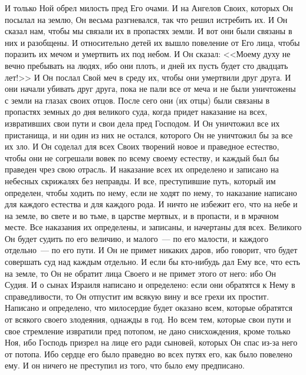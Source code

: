И только Ной обрел милость пред Его очами. И на Ангелов Своих, которых Он
посылал на землю, Он весьма разгневался, так что решил истребить их. И Он
сказал нам, чтобы мы связали их в пропастях земли. И вот они были связаны в них
и разобщены. И относительно детей их вышло повеление от Его лица, чтобы
поразить их мечом и умертвить их под небом. И Он сказал: <<Моему духу не
вечно пребывать на людях, ибо они плоть, и дней их пусть будет сто двадцать
лет!>> И Он послал Свой меч в среду их, чтобы они умертвили друг друга. И
они начали убивать друг друга, пока не пали все от меча и не были уничтожены с
земли на глазах своих отцов. После сего они (их отцы) были связаны в пропастях
земных до дня великого суда, когда придет наказание на всех, извративших свои
пути и свои дела пред Господом. И Он уничтожил все их пристанища, и ни один из
них не остался, которого Он не уничтожил бы за все их зло. И Он соделал для
всех Своих творений новое и праведное естество, чтобы они не согрешали вовек по
всему своему естеству, и каждый был бы праведен чрез свою отрасль. И наказание
всех их определено и записано на небесных скрижалях без неправды. И все,
преступившие путь, который им определен, чтобы ходить по нему, если не ходят по
нему, то наказание написано для каждого естества и для каждого рода. И ничто
не избежит его, что на небе и на земле, во свете и во тьме, в царстве
мертвых, и в пропасти, и в мрачном месте. Все наказания их определены, и
записаны, и начертаны для всех. Великого Он будет судить по его величию, и
малого~--- по его малости, и каждого отдельно~--- по его пути. И Он не
примет никаких даров, ибо говорит, что будет совершать суд над каждым отдельно.
И если бы кто-нибудь дал Ему все, что есть на земле, то Он не обратит лица
Своего и не примет этого от него: ибо Он Судия. И о сынах Израиля написано и
определено: если они обратятся к Нему в справедливости, то Он отпустит им
всякую вину и все грехи их простит. Написано и определено, что милосердие будет
оказано всем, которые обратятся от всякого своего злодеяния, однажды в год. Но
всем тем, которые свои пути и свое стремление извратили пред потопом, не дано
снисхождения, кроме только Ноя, ибо Господь призрел на лице его ради
сыновей, которых Он спас из-за него от потопа. Ибо сердце его было праведно во
всех путях его, как было повелено ему. И он ничего не преступил из того, что
было ему предписано.

